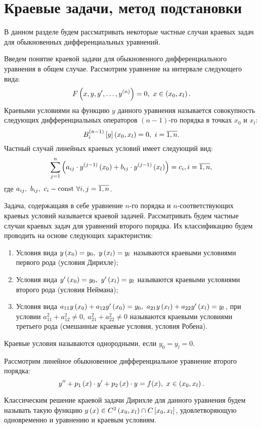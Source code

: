 \section{Краевые задачи, метод подстановки}

	В данном разделе будем рассматривать некоторые частные случаи краевых задач для обыкновенных дифференциальных уравнений.

	Введем понятие краевой задачи для обыкновенного дифференциального уравнения в общем случае. Рассмотрим уравнение на интервале следующего вида:
	\[ F \left( x, y, y', \dots, y^{(n)} \right) = 0, ~ x \in \left( x_0, x_l \right). \]
	Краевыми условиями на функцию $y$ данного уравнения называется совокупность следующих дифференциальных операторов $(n-1)$-го порядка в точках $x_0$ и $x_l$:
	\[ B_i^{(n-1)} \left[ y \right]\left( x_0, x_l \right) = 0, ~ i = \overline{1, n}. \]
	Частный случай линейных краевых условий имеет следующий вид:
	\[ \sum_{j = 1}^{n} \left( a_{ij} \cdot y^{(j-1)}\left( x_0 \right) + b_{ij} \cdot y^{(j-1)} \left( x_l \right) \right) = c_i, i = \overline{1, n}, \]
	где \( a_{ij}, ~ b_{ij}, ~ c_i - \mathrm{const} ~ \forall i, j = \overline{1, n} \).
	
	Задача, содержащаяя в себе уравнение $n$-го порядка и $n$-соответствующих краевых условий называется краевой задачей. Рассматривать будем частные случаи краевых задач для уравнений второго порядка. Их классификацию будем проводить на основе следующих характеристик:
	\begin{enumerate}
		\item Условия вида \( y\left( x_0 \right) = y_0, ~ y\left( x_l \right) = y_l \) называются краевыми условиями первого рода (условия Дирихле);
		\item Условия вида \( y'\left( x_0 \right) = y_0, ~ y'\left( x_l \right) = y_l \) называются краевыми условиями второго рода (условия Неймана);
		\item Условия вида \( a_{11} y\left( x_0 \right) + a_{12} y'\left( x_0 \right) = y_0, ~ a_{21} y\left( x_l \right) + a_{22} y'\left( x_l \right) = y_l \), при условии \( a_{11}^2 + a_{12}^2 \neq 0, ~ a_{21}^2 + a_{22}^2 \neq 0 \) называются краевыми условиями третьего рода (смешанные краевые условия, условия Робена).
	\end{enumerate}
	Краевые условия называются однородными, если $y_0 = y_l = 0$.

	Рассмотрим линейное обыкновенное дифференциальное уравнение второго порядка:
	\[ y'' + p_1 \left( x \right) \cdot y' + p_2 \left( x \right) \cdot y = f(x), ~ x \in \left( x_0, x_l \right). \]

	Классическим решение краевой задачи Дирихле для данного уравнения будем называть такую функцию $y \left( x \right) \in C^{2} \left( x_0, x_l \right) \cap C\left[ x_0, x_l \right]$, удовлетворяющую одновременно и уравнению и краевым условиям.

